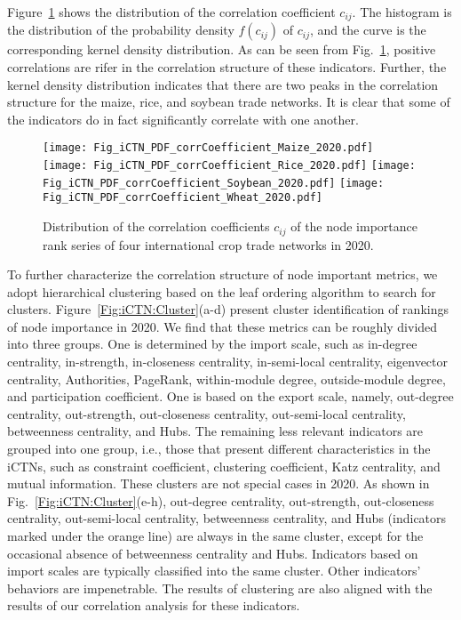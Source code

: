 \documentclass[preprint,3p,times,sort&compress]{elsarticle}
\begin{document}
Figure~\ref{Fig:iCTN:PDF:corrCoefficient:2020} shows the distribution of the correlation coefficient $c_{ij}$. The histogram is the distribution of the probability density $f(c_{ij})$ of $c_{ij}$, and the curve is the corresponding kernel density distribution. As can be seen from Fig.~\ref{Fig:iCTN:PDF:corrCoefficient:2020}, positive correlations are rifer in the correlation structure of these indicators. Further, the kernel density distribution indicates that there are two peaks in the correlation structure for the maize, rice, and soybean trade networks. It is clear that some of the indicators do in fact significantly correlate with one another.

 \begin{figure}[h!]
      \centering
      \texttt{[image: Fig\_iCTN\_PDF\_corrCoefficient\_Maize\_2020.pdf]}
      \texttt{[image: Fig\_iCTN\_PDF\_corrCoefficient\_Rice\_2020.pdf]}
      \texttt{[image: Fig\_iCTN\_PDF\_corrCoefficient\_Soybean\_2020.pdf]}
      \texttt{[image: Fig\_iCTN\_PDF\_corrCoefficient\_Wheat\_2020.pdf]}
      \caption{Distribution of the correlation coefficients $c_{ij}$ of the node importance rank series of four international crop trade networks in 2020. }
      \label{Fig:iCTN:PDF:corrCoefficient:2020}
\end{figure}





To further characterize the correlation structure of node important metrics, we adopt hierarchical clustering based on the leaf ordering algorithm to search for clusters. Figure~\ref{Fig:iCTN:Cluster}(a-d) present cluster identification of rankings of node importance in 2020. We find that these metrics can be roughly divided into three groups. One is determined by the import scale, such as in-degree centrality, in-strength, in-closeness centrality, in-semi-local centrality, eigenvector centrality, Authorities, PageRank, within-module degree, outside-module degree, and participation coefficient. One is based on the export scale, namely, out-degree centrality, out-strength, out-closeness centrality, out-semi-local centrality, betweenness centrality, and Hubs. The remaining less relevant indicators are grouped into one group, i.e., those that present different characteristics in the iCTNs, such as constraint coefficient, clustering coefficient, Katz centrality, and mutual information. These clusters are not special cases in 2020. As shown in Fig.~\ref{Fig:iCTN:Cluster}(e-h), out-degree centrality, out-strength, out-closeness centrality, out-semi-local centrality, betweenness centrality, and Hubs (indicators marked under the orange line) are always in the same cluster, except for the occasional absence of betweenness centrality and Hubs. Indicators based on import scales are typically classified into the same cluster. Other indicators' behaviors are impenetrable. The results of clustering are also aligned with the results of our correlation analysis for these indicators.
\end{document}
